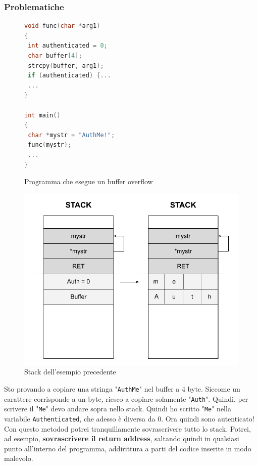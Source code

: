 \documentclass[a4paper,12pt]{article}
\begin{document}
\subsubsection{Problematiche}

\begin{figure}[H]
\begin{lstlisting}[language=C++, xleftmargin=.3\textwidth]
void func(char *arg1)
{
 int authenticated = 0;
 char buffer[4];
 strcpy(buffer, arg1);
 if (authenticated) {...
 ...
}

int main()
{
 char *mystr = "AuthMe!";
 func(mystr);
 ...
}
\end{lstlisting}
\caption{Programma che esegue un buffer overflow}
\end{figure}

\begin{figure}[H]
	\centering
	\includegraphics[width=0.8\linewidth]{Immagini/Stack4.pdf}
	\caption{Stack dell'esempio precedente}
\end{figure}
Sto provando a copiare una stringa "\texttt{AuthMe}" nel buffer a 4 byte. Siccome un carattere corrisponde a un byte, riesco a copiare solamente "\texttt{Auth}". Quindi, per scrivere il "\texttt{Me}" devo andare sopra nello stack. Quindi ho scritto "\texttt{Me}" nella variabile \texttt{Authenticated}, che adesso è diversa da 0. Ora quindi sono autenticato!\\
Con questo metodod potrei tranquillamente sovrascrivere tutto lo stack. Potrei, ad esempio, \textbf{sovrascrivere il return address}, saltando quindi in qualsiasi punto all'interno del programma, addirittura a parti del codice inserite in modo malevolo.
\end{document}
